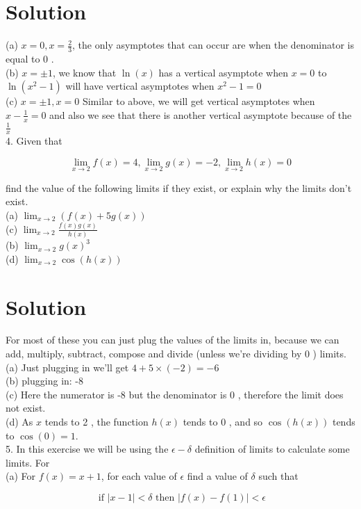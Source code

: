 \documentclass[10pt]{article}
\begin{document}
\section*{Solution}
(a) $x=0, x=\frac{2}{3}$, the only asymptotes that can occur are when the denominator is equal to 0 .\\
(b) $x= \pm 1$, we know that $\ln (x)$ has a vertical asymptote when $x=0$ to $\ln \left(x^{2}-1\right)$ will have vertical asymptotes when $x^{2}-1=0$\\
(c) $x= \pm 1, x=0$ Similar to above, we will get vertical asymptotes when $x-\frac{1}{x}=0$ and also we see that there is another vertical asymptote because of the $\frac{1}{x}$\\
4. Given that

$$
\lim _{x \rightarrow 2} f(x)=4, \lim _{x \rightarrow 2} g(x)=-2, \lim _{x \rightarrow 2} h(x)=0
$$

find the value of the following limits if they exist, or explain why the limits don't exist.\\
(a) $\lim _{x \rightarrow 2}(f(x)+5 g(x))$\\
(c) $\lim _{x \rightarrow 2} \frac{f(x) g(x)}{h(x)}$\\
(b) $\lim _{x \rightarrow 2} g(x)^{3}$\\
(d) $\lim _{x \rightarrow 2} \cos (h(x))$

\section*{Solution}
For most of these you can just plug the values of the limits in, because we can add, multiply, subtract, compose and divide (unless we're dividing by 0 ) limits.\\
(a) Just plugging in we'll get $4+5 \times(-2)=-6$\\
(b) plugging in: -8\\
(c) Here the numerator is -8 but the denominator is 0 , therefore the limit does not exist.\\
(d) As $x$ tends to 2 , the function $h(x)$ tends to 0 , and so $\cos (h(x))$ tends to $\cos (0)=1$.\\
5. In this exercise we will be using the $\epsilon-\delta$ definition of limits to calculate some limits. For\\
(a) For $f(x)=x+1$, for each value of $\epsilon$ find a value of $\delta$ such that

$$
\text { if }|x-1|<\delta \text { then }|f(x)-f(1)|<\epsilon
$$
\end{document}
